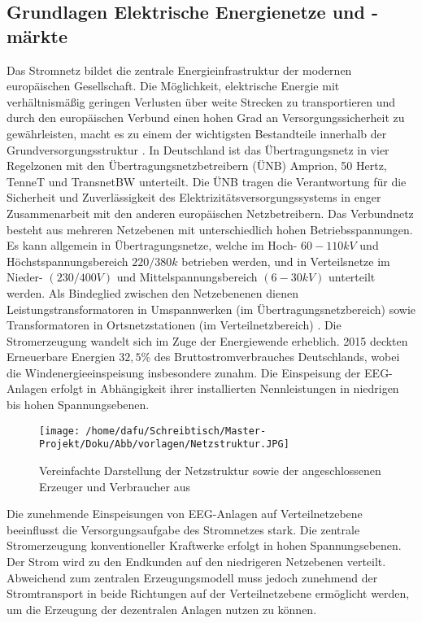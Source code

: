 \documentclass[onecolumn,10pt,titlepage]{article}
\begin{document}
\subsection{Grundlagen Elektrische Energienetze und -märkte}
\label{sub_GrundET}
Das Stromnetz bildet die zentrale Energieinfrastruktur der modernen europäischen Gesellschaft. Die Möglichkeit, elektrische Energie mit verhältnismäßig geringen Verlusten über weite Strecken zu transportieren und durch den europäischen Verbund einen hohen Grad an Versorgungssicherheit zu gewährleisten, macht es zu einem der wichtigsten Bestandteile innerhalb der Grundversorgungsstruktur \cite{Crastan2018}.
 In Deutschland ist das Übertragungsnetz in vier Regelzonen mit den Übertragungsnetzbetreibern (ÜNB) Amprion, 50 Hertz, TenneT und TransnetBW unterteilt. Die ÜNB tragen die Verantwortung für die Sicherheit und Zuverlässigkeit des Elektrizitätsversorgungssystems in enger Zusammenarbeit mit den anderen europäischen Netzbetreibern. Das Verbundnetz besteht aus mehreren Netzebenen mit unterschiedlich hohen Betriebsspannungen. Es kann allgemein in Übertragungsnetze, welche im  Hoch- $60-110kV$ und Höchstspannungsbereich $220/380k$ betrieben werden, und in Verteilsnetze im Nieder- $(230/400V)$ und Mittelspannungsbereich $(6-30 kV)$ unterteilt werden. Als Bindeglied zwischen den Netzebenenen dienen Leistungstransformatoren in Umspannwerken (im Übertragungsnetzbereich) sowie Transformatoren in Ortsnetzstationen (im Verteilnetzbereich) \cite{Konstantin.2013}. Die Stromerzeugung wandelt sich im Zuge der Energiewende erheblich.  2015 deckten Erneuerbare Energien $32,5\%$ des Bruttostromverbrauches Deutschlands, wobei die Windenergieeinspeisung insbesondere zunahm.\cite{Konstantin.2013} Die Einspeisung der EEG-Anlagen erfolgt in Abhängigkeit ihrer installierten Nennleistungen in niedrigen bis hohen Spannungsebenen.

\begin{figure}[H]
	\centering
	\texttt{[image: /home/dafu/Schreibtisch/Master-Projekt/Doku/Abb/vorlagen/Netzstruktur.JPG]}
	\caption[Vereinfachte Darstellung der Netzstruktur]{Vereinfachte Darstellung der Netzstruktur sowie der angeschlossenen Erzeuger und Verbraucher aus \cite{Zapf.2017}}
	\label{fig:Netzstruktur} 
\end{figure}

Die zunehmende Einspeisungen von EEG-Anlagen auf Verteilnetzebene beeinflusst die Versorgungsaufgabe des Stromnetzes stark. Die zentrale Stromerzeugung konventioneller Kraftwerke erfolgt in hohen Spannungsebenen. Der Strom wird zu den Endkunden auf den niedrigeren Netzebenen verteilt. Abweichend zum zentralen Erzeugungsmodell muss jedoch zunehmend der Stromtransport in beide Richtungen auf der Verteilnetzebene ermöglicht werden, um die Erzeugung der dezentralen Anlagen nutzen zu können. 
\end{document}
